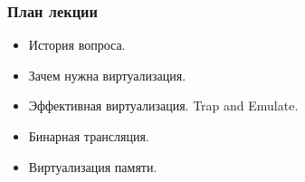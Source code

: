 \begin{frame}
\frametitle{План лекции}
\begin{itemize}
  \item История вопроса.
  \item Зачем нужна виртуализация.
  \item Эффективная виртуализация. Trap and Emulate.
  \item Бинарная трансляция.
  \item Виртуализация памяти.
\end{itemize}
\end{frame}
